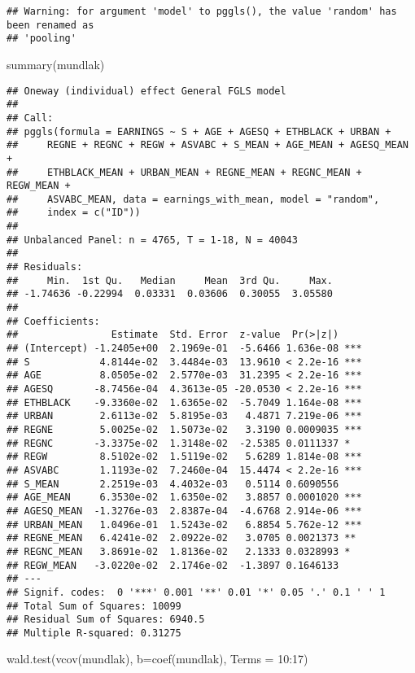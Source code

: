 \documentclass[
]{article}
\newenvironment{Shaded}{\begin{snugshade}}{\end{snugshade}}
\newcommand{\AttributeTok}[1]{\textcolor[rgb]{0.77,0.63,0.00}{#1}}
\newcommand{\DecValTok}[1]{\textcolor[rgb]{0.00,0.00,0.81}{#1}}
\newcommand{\FunctionTok}[1]{\textcolor[rgb]{0.00,0.00,0.00}{#1}}
\newcommand{\NormalTok}[1]{#1}
\newcommand{\SpecialCharTok}[1]{\textcolor[rgb]{0.00,0.00,0.00}{#1}}
\begin{document}
\begin{verbatim}
## Warning: for argument 'model' to pggls(), the value 'random' has been renamed as
## 'pooling'
\end{verbatim}

\begin{Shaded}
\begin{Highlighting}[]
\FunctionTok{summary}\NormalTok{(mundlak)}
\end{Highlighting}
\end{Shaded}

\begin{verbatim}
## Oneway (individual) effect General FGLS model
## 
## Call:
## pggls(formula = EARNINGS ~ S + AGE + AGESQ + ETHBLACK + URBAN + 
##     REGNE + REGNC + REGW + ASVABC + S_MEAN + AGE_MEAN + AGESQ_MEAN + 
##     ETHBLACK_MEAN + URBAN_MEAN + REGNE_MEAN + REGNC_MEAN + REGW_MEAN + 
##     ASVABC_MEAN, data = earnings_with_mean, model = "random", 
##     index = c("ID"))
## 
## Unbalanced Panel: n = 4765, T = 1-18, N = 40043
## 
## Residuals:
##     Min.  1st Qu.   Median     Mean  3rd Qu.     Max. 
## -1.74636 -0.22994  0.03331  0.03606  0.30055  3.05580 
## 
## Coefficients:
##                Estimate  Std. Error  z-value  Pr(>|z|)    
## (Intercept) -1.2405e+00  2.1969e-01  -5.6466 1.636e-08 ***
## S            4.8144e-02  3.4484e-03  13.9610 < 2.2e-16 ***
## AGE          8.0505e-02  2.5770e-03  31.2395 < 2.2e-16 ***
## AGESQ       -8.7456e-04  4.3613e-05 -20.0530 < 2.2e-16 ***
## ETHBLACK    -9.3360e-02  1.6365e-02  -5.7049 1.164e-08 ***
## URBAN        2.6113e-02  5.8195e-03   4.4871 7.219e-06 ***
## REGNE        5.0025e-02  1.5073e-02   3.3190 0.0009035 ***
## REGNC       -3.3375e-02  1.3148e-02  -2.5385 0.0111337 *  
## REGW         8.5102e-02  1.5119e-02   5.6289 1.814e-08 ***
## ASVABC       1.1193e-02  7.2460e-04  15.4474 < 2.2e-16 ***
## S_MEAN       2.2519e-03  4.4032e-03   0.5114 0.6090556    
## AGE_MEAN     6.3530e-02  1.6350e-02   3.8857 0.0001020 ***
## AGESQ_MEAN  -1.3276e-03  2.8387e-04  -4.6768 2.914e-06 ***
## URBAN_MEAN   1.0496e-01  1.5243e-02   6.8854 5.762e-12 ***
## REGNE_MEAN   6.4241e-02  2.0922e-02   3.0705 0.0021373 ** 
## REGNC_MEAN   3.8691e-02  1.8136e-02   2.1333 0.0328993 *  
## REGW_MEAN   -3.0220e-02  2.1746e-02  -1.3897 0.1646133    
## ---
## Signif. codes:  0 '***' 0.001 '**' 0.01 '*' 0.05 '.' 0.1 ' ' 1
## Total Sum of Squares: 10099
## Residual Sum of Squares: 6940.5
## Multiple R-squared: 0.31275
\end{verbatim}

\begin{Shaded}
\begin{Highlighting}[]
\FunctionTok{wald.test}\NormalTok{(}\FunctionTok{vcov}\NormalTok{(mundlak), }\AttributeTok{b=}\FunctionTok{coef}\NormalTok{(mundlak), }\AttributeTok{Terms =} \DecValTok{10}\SpecialCharTok{:}\DecValTok{17}\NormalTok{)}
\end{Highlighting}
\end{Shaded}
\end{document}
